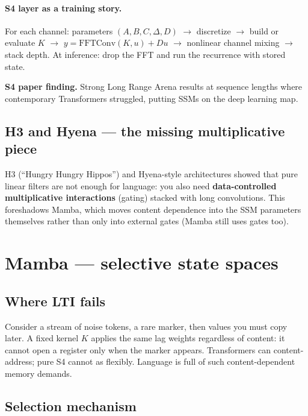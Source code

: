 \documentclass[11pt,a4paper]{article}
\begin{document}
\paragraph{S4 layer as a training story.}
For each channel: parameters $(A,B,C,\Delta,D)$ $\to$ discretize $\to$ build or evaluate $K$ $\to$ $y=\mathrm{FFTConv}(K,u)+Du$ $\to$ nonlinear channel mixing $\to$ stack depth.
At inference: drop the FFT and run the recurrence with stored state.

\textbf{S4 paper finding.}
Strong Long Range Arena results at sequence lengths where contemporary Transformers struggled, putting SSMs on the deep learning map.

\subsection{H3 and Hyena --- the missing multiplicative piece}

H3 (``Hungry Hungry Hippos'') and Hyena-style architectures showed that pure linear filters are not enough for language: you also need \textbf{data-controlled multiplicative interactions} (gating) stacked with long convolutions.
This foreshadows Mamba, which moves content dependence into the SSM parameters themselves rather than only into external gates (Mamba still uses gates too).

\section{Mamba --- selective state spaces}

\subsection{Where LTI fails}

Consider a stream of noise tokens, a rare marker, then values you must copy later.
A fixed kernel $K$ applies the same lag weights regardless of content: it cannot open a register only when the marker appears.
Transformers can content-address; pure S4 cannot as flexibly.
Language is full of such content-dependent memory demands.

\subsection{Selection mechanism}
\end{document}

